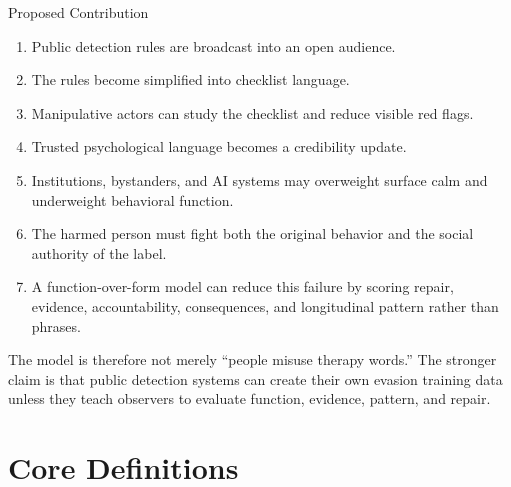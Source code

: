 \documentclass[11pt, letterpaper]{article}
\begin{document}
\begin{frameworkbox}{Proposed Contribution}
\begin{enumerate}
    \item Public detection rules are broadcast into an open audience.
    \item The rules become simplified into checklist language.
    \item Manipulative actors can study the checklist and reduce visible red flags.
    \item Trusted psychological language becomes a credibility update.
    \item Institutions, bystanders, and AI systems may overweight surface calm and underweight behavioral function.
    \item The harmed person must fight both the original behavior and the social authority of the label.
    \item A function-over-form model can reduce this failure by scoring repair, evidence, accountability, consequences, and longitudinal pattern rather than phrases.
\end{enumerate}
\end{frameworkbox}

The model is therefore not merely ``people misuse therapy words.'' The stronger claim is that public detection systems can create their own evasion training data unless they teach observers to evaluate function, evidence, pattern, and repair.

\section{Core Definitions}
\end{document}
